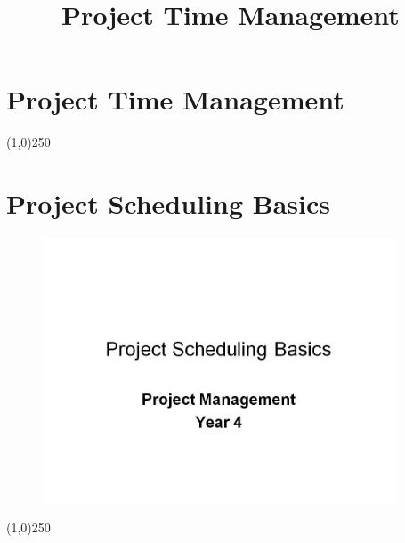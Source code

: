 




\title[Project Management \& BIM]{Project Time Management}



%
\usetikzlibrary{arrows}



\section{Project Time Management}



\tableofcontents
\newpage



\begin{frame}
\titlepage
\end{frame}
\begin{center}\line(1,0){250}\end{center}
%
%

\section{Project Scheduling Basics}


\begin{frame}
\begin{figure}
	\centering
		\includegraphics[width = 10.5cm]{oldnotes/Slide32.jpg}
\end{figure}
\end{frame}
\begin{center}\line(1,0){250}\end{center}



